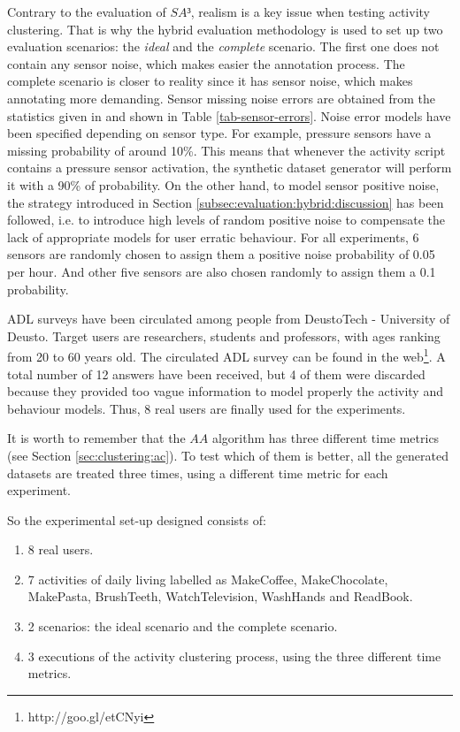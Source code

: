 Contrary to the evaluation of $SA³$, realism is a key issue when testing activity clustering. That is why the hybrid evaluation methodology is used to set up two evaluation scenarios: the \textit{ideal} and the \textit{complete} scenario. The first one does not contain any sensor noise, which makes easier the annotation process. The complete scenario is closer to reality since it has sensor noise, which makes annotating more demanding. Sensor missing noise errors are obtained from the statistics given in \cite{Chen2012a} and shown in Table \ref{tab-sensor-errors}. Noise error models have been specified depending on sensor type. For example, pressure sensors have a missing probability of around 10\%. This means that whenever the activity script contains a pressure sensor activation, the synthetic dataset generator will perform it with a 90\% of probability. On the other hand, to model sensor positive noise, the strategy introduced in Section \ref{subsec:evaluation:hybrid:discussion} has been followed, i.e. to introduce high levels of random positive noise to compensate the lack of appropriate models for user erratic behaviour. For all experiments, 6 sensors are randomly chosen to assign them a positive noise probability of 0.05 per hour. And other five sensors are also chosen randomly to assign them a 0.1 probability. 

ADL surveys have been circulated among people from DeustoTech - University of Deusto. Target users are researchers, students and professors, with ages ranking from 20 to 60 years old. The circulated ADL survey can be found in the web\footnote{http://goo.gl/etCNyi}. A total number of 12 answers have been received, but 4 of them were discarded because they provided too vague information to model properly the activity and  behaviour models. Thus, 8 real users are finally used for the experiments. 

It is worth to remember that the $AA$ algorithm has three different time metrics (see Section \ref{sec:clustering:ac}). To test which of them is better, all the generated datasets are treated three times, using a different time metric for each experiment.

So the experimental set-up designed consists of: 

\begin{enumerate}
 \item 8 real users.
 \item 7 activities of daily living labelled as MakeCoffee, MakeChocolate, MakePasta, BrushTeeth, WatchTelevision, WashHands and ReadBook. 
 \item 2 scenarios: the ideal scenario and the complete scenario.
 \item 3 executions of the activity clustering process, using the three different time metrics.
\end{enumerate}

